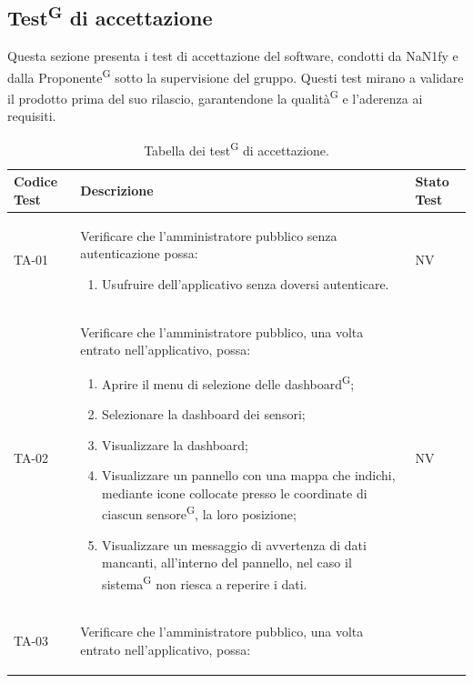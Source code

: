 \documentclass[8pt]{article}
\newcommand{\glossterm}[1]{#1\textsuperscript{G}} %
\begin{document}
\subsection{\glossterm{Test} di accettazione}\label{sec:test accettazione}
Questa sezione presenta i test di accettazione del software, condotti da NaN1fy e dalla
\glossterm{Proponente} sotto la supervisione del gruppo. Questi test mirano a validare il prodotto prima del suo rilascio, garantendone la \glossterm{qualità} e l'aderenza ai requisiti.

\renewcommand{\arraystretch}{2.5}
\begin{longtable}{|>{\centering}p{2cm}|>{\RaggedRight}m{12cm}|>{\centering\arraybackslash}p{2cm}|}
    \hline
    \rowcolor{white}
    \textbf{Codice Test} & \textbf{Descrizione} & \textbf{Stato Test} \\
    \hline
    \endfirsthead 
    \rowcolor{white}
    \caption{Tabella dei \glossterm{test} di accettazione.} 
    \label{table:Tabella dei test di accettazione}
    \endlastfoot  
    TA-01 & Verificare che l'amministratore pubblico senza autenticazione possa:
    \begin{enumerate}
        \setlength\itemsep{0em}
        \item Usufruire dell’applicativo senza doversi autenticare.
    \end{enumerate} & NV \\
    \hline
    TA-02 & Verificare che l'amministratore pubblico, una volta entrato nell'applicativo, possa:
    \begin{enumerate}
        \setlength\itemsep{0em}
        \item Aprire il menu di selezione delle \glossterm{dashboard};
        \item Selezionare la dashboard dei sensori;
        \item Visualizzare la dashboard;
        \item Visualizzare un pannello con una mappa che indichi, mediante icone collocate presso le coordinate di ciascun \glossterm{sensore}, la loro posizione;
        \item Visualizzare un messaggio di avvertenza di dati mancanti, all’interno del pannello, nel caso il \glossterm{sistema} non riesca a reperire i dati.
    \end{enumerate}
    & NV \\
    \hline
    TA-03 & Verificare che l'amministratore pubblico, una volta entrato nell'applicativo, possa:
    \begin{enumerate}

\end{enumerate}
\end{longtable}
\end{document}
